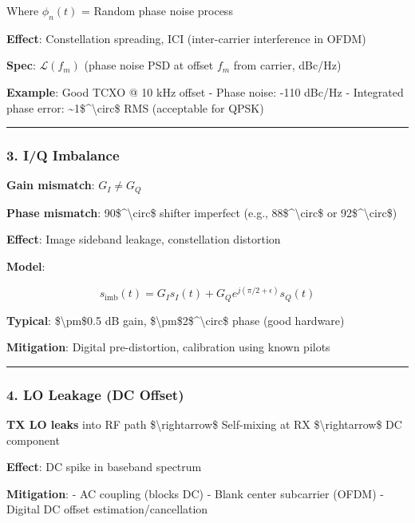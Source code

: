 Where \(\phi_n(t)\) = Random phase noise process

\textbf{Effect}: Constellation spreading, ICI (inter-carrier
interference in OFDM)

\textbf{Spec}: \(\mathcal{L}(f_m)\) (phase noise PSD at offset \(f_m\)
from carrier, dBc/Hz)

\textbf{Example}: Good TCXO @ 10 kHz offset - Phase noise: -110 dBc/Hz -
Integrated phase error: \textasciitilde1\$\^{}\textbackslash circ\$ RMS
(acceptable for QPSK)

\begin{center}\rule{0.5\linewidth}{0.5pt}\end{center}

\subsubsection{3. I/Q Imbalance}\label{iq-imbalance}

\textbf{Gain mismatch}: \(G_I \neq G_Q\)

\textbf{Phase mismatch}: 90\$\^{}\textbackslash circ\$ shifter imperfect
(e.g., 88\$\^{}\textbackslash circ\$ or 92\$\^{}\textbackslash circ\$)

\textbf{Effect}: Image sideband leakage, constellation distortion

\textbf{Model}:

\[
s_{\text{imb}}(t) = G_I s_I(t) + G_Q e^{j(\pi/2 + \epsilon)} s_Q(t)
\]

\textbf{Typical}: \$\textbackslash pm\$0.5 dB gain,
\$\textbackslash pm\$2\$\^{}\textbackslash circ\$ phase (good hardware)

\textbf{Mitigation}: Digital pre-distortion, calibration using known
pilots

\begin{center}\rule{0.5\linewidth}{0.5pt}\end{center}

\subsubsection{4. LO Leakage (DC Offset)}\label{lo-leakage-dc-offset}

\textbf{TX LO leaks} into RF path \$\textbackslash rightarrow\$
Self-mixing at RX \$\textbackslash rightarrow\$ DC component

\textbf{Effect}: DC spike in baseband spectrum

\textbf{Mitigation}: - AC coupling (blocks DC) - Blank center subcarrier
(OFDM) - Digital DC offset estimation/cancellation

